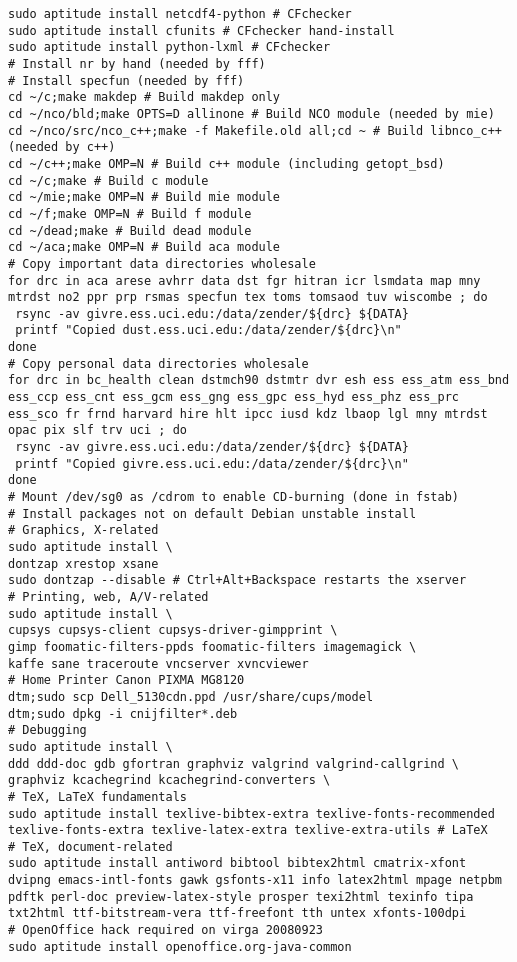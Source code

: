 \documentclass[12pt,twoside]{article}
\begin{document}
\begin{verbatim}
sudo aptitude install netcdf4-python # CFchecker
sudo aptitude install cfunits # CFchecker hand-install
sudo aptitude install python-lxml # CFchecker
# Install nr by hand (needed by fff)
# Install specfun (needed by fff)
cd ~/c;make makdep # Build makdep only
cd ~/nco/bld;make OPTS=D allinone # Build NCO module (needed by mie)
cd ~/nco/src/nco_c++;make -f Makefile.old all;cd ~ # Build libnco_c++ (needed by c++)
cd ~/c++;make OMP=N # Build c++ module (including getopt_bsd)
cd ~/c;make # Build c module
cd ~/mie;make OMP=N # Build mie module
cd ~/f;make OMP=N # Build f module
cd ~/dead;make # Build dead module
cd ~/aca;make OMP=N # Build aca module
# Copy important data directories wholesale
for drc in aca arese avhrr data dst fgr hitran icr lsmdata map mny mtrdst no2 ppr prp rsmas specfun tex toms tomsaod tuv wiscombe ; do
 rsync -av givre.ess.uci.edu:/data/zender/${drc} ${DATA}
 printf "Copied dust.ess.uci.edu:/data/zender/${drc}\n"
done
# Copy personal data directories wholesale
for drc in bc_health clean dstmch90 dstmtr dvr esh ess ess_atm ess_bnd ess_ccp ess_cnt ess_gcm ess_gng ess_gpc ess_hyd ess_phz ess_prc ess_sco fr frnd harvard hire hlt ipcc iusd kdz lbaop lgl mny mtrdst opac pix slf trv uci ; do
 rsync -av givre.ess.uci.edu:/data/zender/${drc} ${DATA}
 printf "Copied givre.ess.uci.edu:/data/zender/${drc}\n"
done
# Mount /dev/sg0 as /cdrom to enable CD-burning (done in fstab)
# Install packages not on default Debian unstable install 
# Graphics, X-related
sudo aptitude install \
dontzap xrestop xsane
sudo dontzap --disable # Ctrl+Alt+Backspace restarts the xserver
# Printing, web, A/V-related
sudo aptitude install \
cupsys cupsys-client cupsys-driver-gimpprint \
gimp foomatic-filters-ppds foomatic-filters imagemagick \
kaffe sane traceroute vncserver xvncviewer
# Home Printer Canon PIXMA MG8120
dtm;sudo scp Dell_5130cdn.ppd /usr/share/cups/model
dtm;sudo dpkg -i cnijfilter*.deb
# Debugging
sudo aptitude install \
ddd ddd-doc gdb gfortran graphviz valgrind valgrind-callgrind \
graphviz kcachegrind kcachegrind-converters \
# TeX, LaTeX fundamentals
sudo aptitude install texlive-bibtex-extra texlive-fonts-recommended texlive-fonts-extra texlive-latex-extra texlive-extra-utils # LaTeX
# TeX, document-related
sudo aptitude install antiword bibtool bibtex2html cmatrix-xfont dvipng emacs-intl-fonts gawk gsfonts-x11 info latex2html mpage netpbm pdftk perl-doc preview-latex-style prosper texi2html texinfo tipa txt2html ttf-bitstream-vera ttf-freefont tth untex xfonts-100dpi 
# OpenOffice hack required on virga 20080923
sudo aptitude install openoffice.org-java-common

\end{verbatim}
\end{document}
